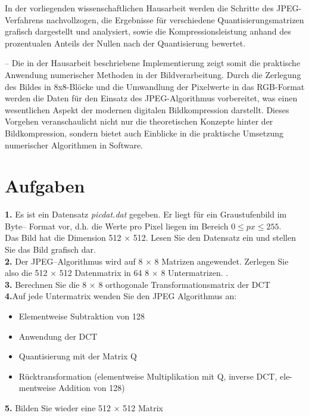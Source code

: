 \documentclass[12pt]{article}
\begin{document}
	In der vorliegenden wissenschaftlichen Hausarbeit werden die Schritte des JPEG-Verfahrens nachvollzogen, die Ergebnisse für verschiedene Quantisierungsmatrizen grafisch dargestellt und analysiert, sowie die Kompressionsleistung anhand des prozentualen Anteils der Nullen nach der Quantisierung bewertet.
	
	
	--
	 Die in der Hausarbeit beschriebene Implementierung zeigt somit die praktische Anwendung numerischer Methoden in der Bildverarbeitung. Durch die Zerlegung des Bildes in 8x8-Blöcke und die Umwandlung der Pixelwerte in das RGB-Format werden die Daten für den Einsatz des JPEG-Algorithmus vorbereitet, was einen wesentlichen Aspekt der modernen digitalen Bildkompression darstellt. Dieses Vorgehen veranschaulicht nicht nur die theoretischen Konzepte hinter der Bildkompression, sondern bietet auch Einblicke in die praktische Umsetzung numerischer Algorithmen in Software.
		\newpage
	\section{Aufgaben}
	\textbf{1.} Es ist ein Datensatz\textit{ picdat.dat} gegeben. Er liegt für ein Graustufenbild im Byte– Format vor, d.h. die Werte pro Pixel liegen im Bereich \(0 \leq px \leq 255\). \\
	Das Bild hat die Dimension 512 × 512. Lesen Sie den Datensatz ein und stellen Sie das Bild grafisch dar. \\
	
	\textbf{2.} Der JPEG–Algorithmus wird auf 8 × 8 Matrizen angewendet. Zerlegen Sie also die 512 × 512 Datenmatrix in 64 8 × 8 Untermatrizen.
	. \\
	
	\textbf{3.} Berechnen Sie die 8 × 8 orthogonale Transformationsmatrix der DCT \\
	
	\textbf{4.}Auf jede Untermatrix wenden Sie den JPEG Algorithmus an: 
	\begin{itemize}
		\setlength{\itemsep}{-12pt}
	\item Elementweise Subtraktion von 128\\
	\item Anwendung der DCT\\
	\item Quantisierung mit der Matrix Q\\
	\item Rücktransformation (elementweise Multiplikation mit Q, inverse DCT, ele- mentweise Addition von 128)\\
	\end{itemize}
	\textbf{5.} Bilden Sie wieder eine 512 × 512 Matrix \\
	
\end{document}
